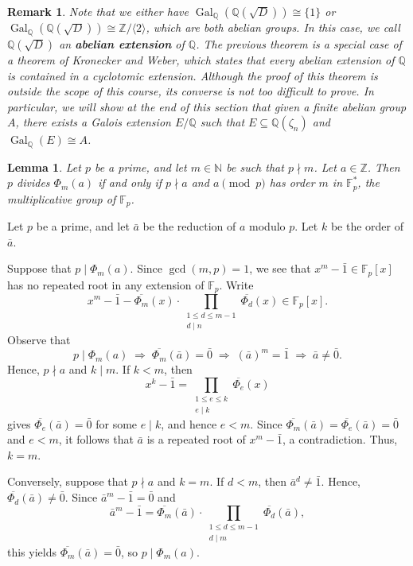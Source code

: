 \documentclass[10pt]{article}
\makeatletter
\newcommand{\N}{\mathbb{N}}
\newcommand{\Z}{\mathbb{Z}}
\newcommand{\Q}{\mathbb{Q}}
\newcommand{\F}{\mathbb{F}}
\DeclareMathOperator{\Gal}{Gal}
\theoremstyle{newstyle}
\newtheorem{lemma}[thm]{Lemma}
\newtheorem{remark}[thm]{Remark}
\newenvironment{pf}[1][\proofname]{\par
  \pushQED{\qed}%
  \normalfont \topsep0\p@\relax
  \trivlist
  \item[\hskip\labelsep\scshape
  #1\@addpunct{.}]\ignorespaces
}{%
  \popQED\endtrivlist\@endpefalse
}
\makeatother
\begin{document}
\begin{remark}
Note that we either have $\Gal_{\Q}(\Q(\sqrt D)) \cong \{1\}$ or $\Gal_{\Q}(\Q(\sqrt D)) \cong 
\Z/\langle 2 \rangle$, which are both abelian groups. In this case, we call $\Q(\sqrt D)$ an 
{\bf abelian extension} of $\Q$. The previous theorem is a special case of a theorem of Kronecker 
and Weber, which states that every abelian extension of $\Q$ is contained in a cyclotomic 
extension. Although the proof of this theorem is outside the scope of this course, its 
converse is not too difficult to prove. In particular, we will show at the end of this section 
that given a finite abelian group $A$, there exists a Galois extension $E/\Q$ such that 
$E \subseteq \Q(\zeta_n)$ and $\Gal_{\Q}(E) \cong A$. 
\end{remark}

\begin{lemma}
Let $p$ be a prime, and let $m \in \N$ be such that $p \nmid m$. Let $a \in \Z$. Then 
$p$ divides $\Phi_m(a)$ if and only if $p \nmid a$ and $a \pmod p$ has order $m$ in 
$\F_p^*$, the multiplicative group of $\F_p$. 
\end{lemma}
\begin{pf}
Let $p$ be a prime, and let $\bar a$ be the reduction of $a$ modulo $p$. Let $k$ be the order of $\bar a$.

Suppose that $p \mid \Phi_m(a)$. Since $\gcd(m, p) = 1$, we see that $x^m - \bar1 \in \F_p[x]$ has 
no repeated root in any extension of $\F_p$. Write 
\[ x^m - \bar1 - \overline{\Phi_m}(x) \cdot \prod_{\substack{1 \leq d \leq m-1 \\ d \mid n}}
\overline{\Phi_d}(x) \in \F_p[x]. \]
Observe that 
\[ p \mid \Phi_m(a) \;\Longrightarrow\; \overline{\Phi_m}(\bar a) = \bar0 \;\Longrightarrow\; 
(\bar a)^m = \bar1 \;\Longrightarrow\; \bar a \neq \bar0. \]
Hence, $p \nmid a$ and $k \mid m$. If $k < m$, then 
\[ x^k - \bar1 = \prod_{\substack{1 \leq e \leq k \\ e \mid k}} \overline{\Phi_e}(x) \]
gives $\overline{\Phi_e}(\bar a) = \bar 0$ for some $e \mid k$, and hence $e < m$. 
Since $\overline{\Phi_m}(\bar a) = \overline{\Phi_e}(\bar a) = \bar 0$ and $e < m$, it follows that 
$\bar a$ is a repeated root of $x^m - \bar1$, a contradiction. Thus, $k = m$. 

Conversely, suppose that $p \nmid a$ and $k = m$. If $d < m$, then $\bar a^d \neq \bar 1$. Hence, 
$\overline{\Phi_d}(\bar a) \neq \bar 0$. Since $\bar a^m - \bar 1 = \bar 0$ and 
\[ \bar a^m - \bar 1 = \overline{\Phi_m}(\bar a) \cdot \prod_{\substack{1 \leq d \leq m-1 \\ d \mid m}}
\overline{\Phi_d}(\bar a), \]
this yields $\overline{\Phi_m}(\bar a) = \bar 0$, so $p \mid \Phi_m(a)$. 
\end{pf}
\end{document}
